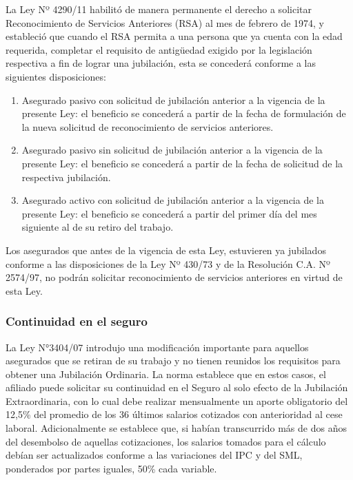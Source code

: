 La Ley Nº 4290/11 habilitó de manera permanente el derecho a solicitar Reconocimiento de Servicios Anteriores (RSA) al mes de febrero de 1974, y estableció que cuando el RSA permita a una persona que ya cuenta con la edad requerida, completar el requisito de antigüedad exigido por la legislación respectiva a fin de lograr una jubilación, esta se concederá conforme a las siguientes disposiciones:

\begin{enumerate}[label=\alph*.]

\item Asegurado pasivo con solicitud de jubilación anterior a la vigencia de la presente Ley: el beneficio se concederá a partir de la fecha de formulación de la nueva solicitud de reconocimiento de servicios anteriores.

\item Asegurado pasivo sin solicitud de jubilación anterior a la vigencia de la presente Ley: el beneficio se concederá a partir de la fecha de solicitud de la respectiva jubilación.

\item Asegurado activo con solicitud de jubilación anterior a la vigencia de la presente Ley: el beneficio se concederá a partir del primer día del mes siguiente al de su retiro del trabajo.

\end{enumerate}

Los asegurados que antes de la vigencia de esta Ley, estuvieren ya jubilados conforme a las disposiciones de la Ley Nº 430/73 y de la Resolución C.A. Nº 2574/97, no podrán solicitar reconocimiento de servicios anteriores en virtud de esta Ley.

\subsubsection{Continuidad en el seguro}

La Ley N°3404/07 introdujo una modificación importante para aquellos asegurados que se retiran de su trabajo y no tienen reunidos los requisitos para obtener una Jubilación Ordinaria. La norma establece que en estos casos, el afiliado puede solicitar su continuidad en el Seguro al solo efecto de la Jubilación Extraordinaria, con lo cual debe realizar mensualmente un aporte obligatorio del 12,5\% del promedio de los 36 últimos salarios cotizados con anterioridad al cese laboral. Adicionalmente se establece que, si habían transcurrido más de dos años del desembolso de aquellas cotizaciones, los salarios tomados para el cálculo debían ser actualizados conforme a las variaciones del IPC y del SML, ponderados por partes iguales, 50\% cada variable.

